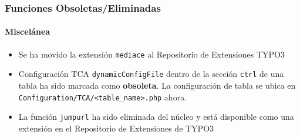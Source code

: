
\begin{frame}[fragile]
	\frametitle{Funciones Obsoletas/Eliminadas}
	\framesubtitle{Miscelánea}

	\begin{itemize}

		\item Se ha movido la extensión \texttt{mediace} al Repositorio de Extensiones TYPO3

		\item Configuración TCA \texttt{dynamicConfigFile} dentro de la sección \texttt{ctrl} de una
			tabla ha sido marcada como \textbf{obsoleta}.
			La configuración de tabla se ubica en \texttt{Configuration/TCA/<table\_name>.php} ahora.

		\item La función \texttt{jumpurl} ha sido eliminada del núcleo y está disponible
			como una extensión en el Repositorio de Extensiones de TYPO3

	\end{itemize}

\end{frame}

